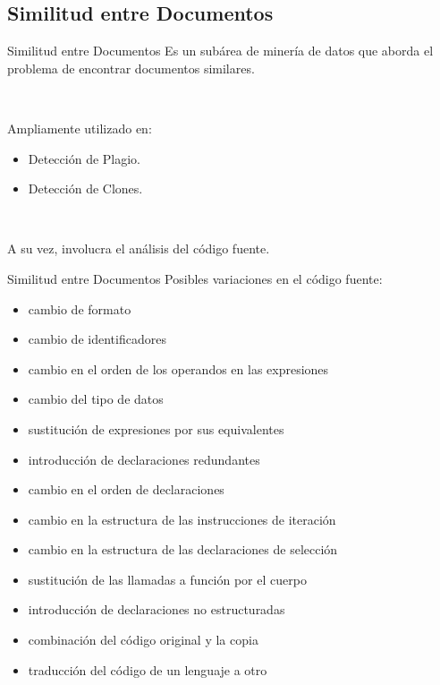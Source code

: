 \documentclass{beamer}
\begin{document}
\subsection{Similitud entre Documentos}
\begin{frame}{Similitud entre Documentos}
Es un subárea de minería de datos que aborda el problema de encontrar
documentos similares.

~

Ampliamente utilizado en:
\begin{itemize}
  \item Detección de Plagio.
  \item Detección de Clones.
\end{itemize}

~

A su vez, involucra el análisis del código fuente.
\end{frame}

\begin{frame}{Similitud entre Documentos}
Posibles variaciones en el código fuente:
\begin{itemize}
  \item cambio de formato
  \item cambio de identificadores
  \item cambio en el orden de los operandos en las expresiones
  \item cambio del tipo de datos
  \item sustitución de expresiones por sus equivalentes
  \item introducción de declaraciones redundantes
  \item cambio en el orden de declaraciones
  \item cambio en la estructura de las instrucciones de iteración
  \item cambio en la estructura de las declaraciones de selección
  \item sustitución de las llamadas a función por el cuerpo
  \item introducción de declaraciones no estructuradas
  \item combinación del código original y la copia
  \item traducción del código de un lenguaje a otro
\end{itemize}
\end{frame}
\end{document}
